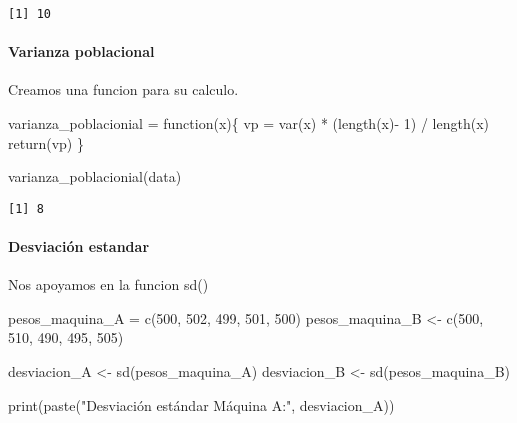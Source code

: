 \documentclass[
  letterpaper,
  DIV=11,
  numbers=noendperiod]{scrartcl}
\let\oldparagraph\paragraph
\renewcommand{\paragraph}[1]{\oldparagraph{#1}\mbox{}}
\newenvironment{Shaded}{\begin{snugshade}}{\end{snugshade}}
\newcommand{\ControlFlowTok}[1]{\textcolor[rgb]{0.00,0.23,0.31}{#1}}
\newcommand{\DecValTok}[1]{\textcolor[rgb]{0.68,0.00,0.00}{#1}}
\newcommand{\FunctionTok}[1]{\textcolor[rgb]{0.28,0.35,0.67}{#1}}
\newcommand{\NormalTok}[1]{\textcolor[rgb]{0.00,0.23,0.31}{#1}}
\newcommand{\OtherTok}[1]{\textcolor[rgb]{0.00,0.23,0.31}{#1}}
\newcommand{\SpecialCharTok}[1]{\textcolor[rgb]{0.37,0.37,0.37}{#1}}
\newcommand{\StringTok}[1]{\textcolor[rgb]{0.13,0.47,0.30}{#1}}
\begin{document}
\begin{verbatim}
[1] 10
\end{verbatim}

\paragraph{Varianza poblacional}\label{varianza-poblacional}

Creamos una funcion para su calculo.

\begin{Shaded}
\begin{Highlighting}[]
\NormalTok{varianza\_poblacionial }\OtherTok{=} \ControlFlowTok{function}\NormalTok{(x)\{}
\NormalTok{  vp }\OtherTok{=} \FunctionTok{var}\NormalTok{(x) }\SpecialCharTok{*}\NormalTok{ (}\FunctionTok{length}\NormalTok{(x)}\SpecialCharTok{{-}} \DecValTok{1}\NormalTok{) }\SpecialCharTok{/} \FunctionTok{length}\NormalTok{(x)}
  \FunctionTok{return}\NormalTok{(vp)}
\NormalTok{\}}

\FunctionTok{varianza\_poblacionial}\NormalTok{(data)}
\end{Highlighting}
\end{Shaded}

\begin{verbatim}
[1] 8
\end{verbatim}

\paragraph{Desviación estandar}\label{desviaciuxf3n-estandar}

Nos apoyamos en la funcion sd()

\begin{Shaded}
\begin{Highlighting}[]
\NormalTok{pesos\_maquina\_A }\OtherTok{=} \FunctionTok{c}\NormalTok{(}\DecValTok{500}\NormalTok{, }\DecValTok{502}\NormalTok{, }\DecValTok{499}\NormalTok{, }\DecValTok{501}\NormalTok{, }\DecValTok{500}\NormalTok{)}
\NormalTok{pesos\_maquina\_B }\OtherTok{\textless{}{-}} \FunctionTok{c}\NormalTok{(}\DecValTok{500}\NormalTok{, }\DecValTok{510}\NormalTok{, }\DecValTok{490}\NormalTok{, }\DecValTok{495}\NormalTok{, }\DecValTok{505}\NormalTok{)}

\NormalTok{desviacion\_A }\OtherTok{\textless{}{-}} \FunctionTok{sd}\NormalTok{(pesos\_maquina\_A)}
\NormalTok{desviacion\_B }\OtherTok{\textless{}{-}} \FunctionTok{sd}\NormalTok{(pesos\_maquina\_B)}

\FunctionTok{print}\NormalTok{(}\FunctionTok{paste}\NormalTok{(}\StringTok{"Desviación estándar Máquina A:"}\NormalTok{, desviacion\_A))}
\end{Highlighting}
\end{Shaded}
\end{document}
